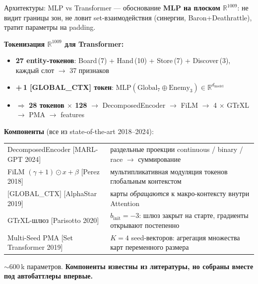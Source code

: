 \documentclass[aspectratio=169,10pt]{beamer}
\newcommand{\cit}[1]{\textcolor{gray!70!black}{\scriptsize[#1]}}
\begin{document}
\begin{frame}{Архитектуры: MLP vs Transformer --- обоснование}
  \textbf{MLP на плоском $\mathbb{R}^{1009}$}: не видит границы зон, не ловит set-взаимодействия (синергии, Baron+Deathrattle), тратит параметры на padding.

  \vspace{0.3em}
  \textbf{Токенизация $\mathbb{R}^{1009}$ для Transformer:}
  \small
  \begin{itemize}\itemsep0pt
    \item \textbf{27 entity-токенов}: Board\,(7) + Hand\,(10) + Store\,(7) + Discover\,(3), каждый слот $\to$ 37 признаков
    \item \textbf{+\,1 [GLOBAL\_CTX] токен}: $\text{MLP}(\text{Global}_7 \oplus \text{Enemy}_3) \in \mathbb{R}^{d_{\text{model}}}$
    \item $\Rightarrow$ \textbf{28 токенов $\times$ 128} $\to$ DecomposedEncoder $\to$ FiLM $\to$ 4 $\times$ GTrXL $\to$ PMA $\to$ features
  \end{itemize}
  \normalsize

  \vspace{0.2em}
  \textbf{Компоненты} (все из state-of-the-art 2018--2024):
  \footnotesize
  \begin{tabular}{p{3.6cm}p{10.2cm}}
    \toprule
    DecomposedEncoder \cit{MARL-GPT 2024} & раздельные проекции continuous / binary / race $\to$ суммирование \\
    FiLM $(\gamma+1)\odot x + \beta$ \cit{Perez 2018} & мультипликативная модуляция токенов глобальным контекстом \\
    {[GLOBAL\_CTX]} \cit{AlphaStar 2019} & карты \emph{обращаются} к макро-контексту внутри Attention \\
    GTrXL-шлюз \cit{Parisotto 2020} & $b_{\text{init}}{=}{-}3$: шлюз закрыт на старте, градиенты открывают постепенно \\
    Multi-Seed PMA \cit{Set Transformer 2019} & $K{=}4$ seed-векторов: агрегация множества карт переменного размера \\
    \bottomrule
  \end{tabular}
  \normalsize

  \vspace{0.2em}
  $\sim$600\,k параметров. \textbf{Компоненты известны из литературы, но собраны вместе под автобаттлеры впервые.}
\end{frame}
\end{document}

